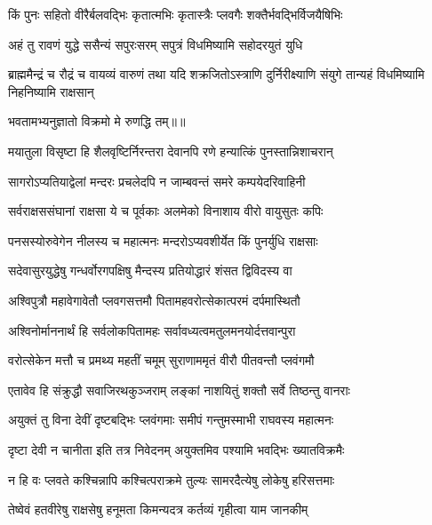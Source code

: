 \twolineshloka
{किं पुनः सहितो वीरैर्बलवद्भिः कृतात्मभिः}
{कृतास्त्रैः प्लवगैः शक्तैर्भवद्भिर्विजयैषिभिः} %

\twolineshloka
{अहं तु रावणं युद्धे ससैन्यं सपुरःसरम्}
{सपुत्रं विधमिष्यामि सहोदरयुतं युधि} %

\threelineshloka
{ब्राह्ममैन्द्रं च रौद्रं च वायव्यं वारुणं तथा}
{यदि शक्रजितोऽस्त्राणि दुर्निरीक्ष्याणि संयुगे}
{तान्यहं विधमिष्यामि निहनिष्यामि राक्षसान्} %

{भवतामभ्यनुज्ञातो विक्रमो मे रुणद्धि तम्॥॥} %

\addtocounter{shlokacount}{1}

\twolineshloka
{मयातुला विसृष्टा हि शैलवृष्टिर्निरन्तरा}
{देवानपि रणे हन्यात्किं पुनस्तान्निशाचरान्} %

\twolineshloka
{सागरोऽप्यतियाद्वेलां मन्दरः प्रचलेदपि}
{न जाम्बवन्तं समरे कम्पयेदरिवाहिनी} %

\twolineshloka
{सर्वराक्षससंघानां राक्षसा ये च पूर्वकाः}
{अलमेको विनाशाय वीरो वायुसुतः कपिः} %

\twolineshloka
{पनसस्योरुवेगेन नीलस्य च महात्मनः}
{मन्दरोऽप्यवशीर्येत किं पुनर्युधि राक्षसाः} %

\twolineshloka
{सदेवासुरयुद्धेषु गन्धर्वोरगपक्षिषु}
{मैन्दस्य प्रतियोद्धारं शंसत द्विविदस्य वा} %

\twolineshloka
{अश्विपुत्रौ महावेगावेतौ प्लवगसत्तमौ}
{पितामहवरोत्सेकात्परमं दर्पमास्थितौ} %

\twolineshloka
{अश्विनोर्माननार्थं हि सर्वलोकपितामहः}
{सर्वावध्यत्वमतुलमनयोर्दत्तवान्पुरा} %

\twolineshloka
{वरोत्सेकेन मत्तौ च प्रमथ्य महतीं चमूम्}
{सुराणाममृतं वीरौ पीतवन्तौ प्लवंगमौ} %

\twolineshloka
{एतावेव हि संक्रुद्धौ सवाजिरथकुञ्जराम्}
{लङ्कां नाशयितुं शक्तौ सर्वे तिष्ठन्तु वानराः} %

\twolineshloka
{अयुक्तं तु विना देवीं दृष्टबद्भिः प्लवंगमाः}
{समीपं गन्तुमस्माभी राघवस्य महात्मनः} %

\twolineshloka
{दृष्टा देवी न चानीता इति तत्र निवेदनम्}
{अयुक्तमिव पश्यामि भवद्भिः ख्यातविक्रमैः} %

\twolineshloka
{न हि वः प्लवते कश्चिन्नापि कश्चित्पराक्रमे}
{तुल्यः सामरदैत्येषु लोकेषु हरिसत्तमाः} %

\twolineshloka
{तेष्वेवं हतवीरेषु राक्षसेषु हनूमता}
{किमन्यदत्र कर्तव्यं गृहीत्वा याम जानकीम्} %

